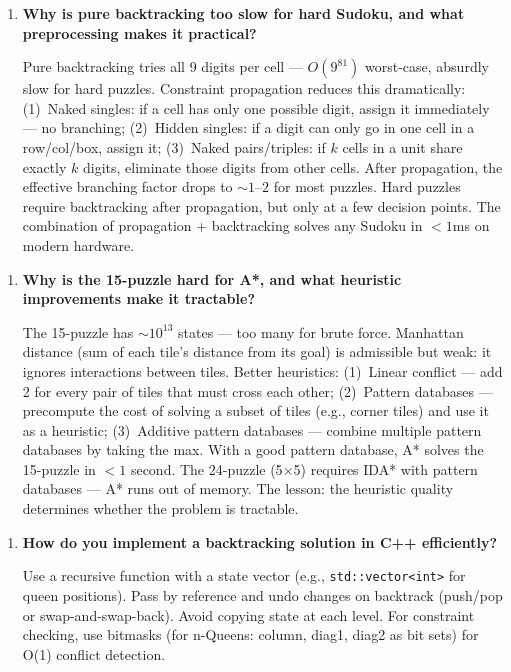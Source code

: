 \begin{enumerate}
\item \textbf{Why is pure backtracking too slow for hard Sudoku, and what preprocessing makes it practical?}

Pure backtracking tries all 9 digits per cell --- $O(9^{81})$ worst-case, absurdly slow for hard puzzles. Constraint propagation reduces this dramatically: (1)~Naked singles: if a cell has only one possible digit, assign it immediately --- no branching; (2)~Hidden singles: if a digit can only go in one cell in a row/col/box, assign it; (3)~Naked pairs/triples: if $k$ cells in a unit share exactly $k$ digits, eliminate those digits from other cells. After propagation, the effective branching factor drops to $\sim 1$--$2$ for most puzzles. Hard puzzles require backtracking after propagation, but only at a few decision points. The combination of propagation + backtracking solves any Sudoku in $< 1$ms on modern hardware.
\end{enumerate}

\begin{enumerate}
\item \textbf{Why is the 15-puzzle hard for A*, and what heuristic improvements make it tractable?}

The 15-puzzle has $\sim 10^{13}$ states --- too many for brute force. Manhattan distance (sum of each tile's distance from its goal) is admissible but weak: it ignores interactions between tiles. Better heuristics: (1)~Linear conflict --- add 2 for every pair of tiles that must cross each other; (2)~Pattern databases --- precompute the cost of solving a subset of tiles (e.g., corner tiles) and use it as a heuristic; (3)~Additive pattern databases --- combine multiple pattern databases by taking the max. With a good pattern database, A* solves the 15-puzzle in $< 1$ second. The 24-puzzle (5$\times$5) requires IDA* with pattern databases --- A* runs out of memory. The lesson: the heuristic quality determines whether the problem is tractable.
\end{enumerate}

\begin{enumerate}
\item \textbf{How do you implement a backtracking solution in C++ efficiently?}

Use a recursive function with a state vector (e.g., \texttt{std::vector<int>} for queen positions). Pass by reference and undo changes on backtrack (push/pop or swap-and-swap-back). Avoid copying state at each level. For constraint checking, use bitmasks (for n-Queens: column, diag1, diag2 as bit sets) for O(1) conflict detection.
\end{enumerate}

